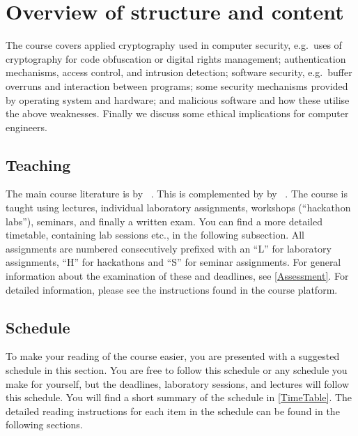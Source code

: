 \section{Overview of structure and content}
\label{CourseOutline}
The course covers
applied cryptography used in computer security, e.g.~uses of cryptography for 
code obfuscation or digital rights management;
authentication mechanisms, access control, and intrusion detection;
software security, e.g.~buffer overruns and interaction between programs;
some security mechanisms provided by operating system and hardware;
and malicious software and how these utilise the above weaknesses.
Finally we discuss some ethical implications for computer engineers.

\subsection{Teaching}

The main course literature is  by 
\citeauthor{Gollmann2011cs}~\cite{Gollmann2011cs}.
This is complemented by  by 
\citeauthor{Anderson2008sea}~\cite{Anderson2008sea}.
The course is taught using lectures, individual laboratory assignments, 
workshops (\enquote{hackathon labs}), seminars, and finally a written exam.
You can find a more detailed timetable, containing lab sessions etc., in the 
following subsection.
All assignments are numbered consecutively prefixed with an \enquote{L} for 
laboratory assignments, \enquote{H} for hackathons and \enquote{S} for seminar 
assignments.
For general information about the examination of these and deadlines, see 
\cref{Assessment}.
For detailed information, please see the instructions found in the course 
platform.

\subsection{Schedule}
\label{Schedule}

To make your reading of the course easier, you are presented with a suggested 
schedule in this section.
You are free to follow this schedule or any schedule you make for yourself, but 
the deadlines, laboratory sessions, and lectures will follow this schedule.
You will find a short summary of the schedule in \cref{TimeTable}.
The detailed reading instructions for each item in the schedule can be found in 
the following sections.

